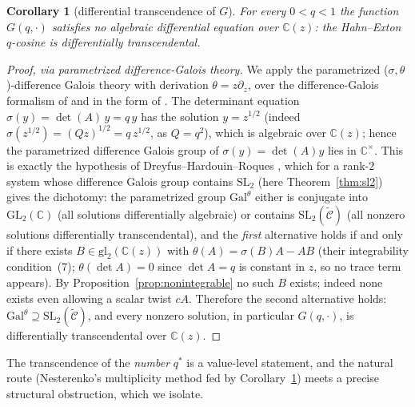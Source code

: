 \documentclass[11pt]{article}
\theoremstyle{plain}
\newtheorem{corollary}[theorem]{Corollary}
\theoremstyle{definition}
\theoremstyle{remark}
\newcommand{\C}{\mathbb{C}}
\begin{document}
\begin{corollary}[differential transcendence of $G$]
\label{cor:hypertranscendence}
For every $0<q<1$ the function $G(q,\cdot)$ satisfies no algebraic differential equation over
$\C(z)$: the Hahn--Exton $q$-cosine is differentially transcendental.
\end{corollary}

\begin{proof}[Proof, via parametrized difference-Galois theory]
We apply the parametrized ($\sigma,\theta$)-difference Galois theory with derivation
$\theta=z\partial_z$, over the difference-Galois formalism of \cite{PutSinger1997} and in the
form of \cite{DHR2018,ADR2021}. The determinant equation $\sigma(y)=\det(A)\,y=q\,y$ has the solution
$y=z^{1/2}$ (indeed $\sigma(z^{1/2})=(Qz)^{1/2}=q\,z^{1/2}$, as $Q=q^2$), which is algebraic over $\C(z)$; hence the parametrized difference Galois group of $\sigma(y)=\det(A)y$
lies in $\C^\times$. This is exactly the hypothesis of Dreyfus--Hardouin--Roques
\cite[Prop.~2.9]{DHR2018}, which for a rank-$2$ system whose difference Galois group contains
$\mathrm{SL}_2$ (here Theorem~\ref{thm:sl2}) gives the dichotomy: the parametrized group
$\mathrm{Gal}^\theta$ either is conjugate into $\mathrm{GL}_2(\C)$ (all solutions differentially
algebraic) or contains $\mathrm{SL}_2(\widetilde{\mathcal C})$ (all nonzero solutions
differentially transcendental), and the \emph{first} alternative holds if and only if there exists
$B\in\mathrm{gl}_2(\C(z))$ with $\theta(A)=\sigma(B)A-AB$ (their integrability condition~(7);
$\theta(\det A)=0$ since $\det A=q$ is constant in $z$, so no trace term appears). By
Proposition~\ref{prop:nonintegrable} no such $B$ exists; indeed none exists even allowing a
scalar twist $cA$. Therefore the second alternative holds:
$\mathrm{Gal}^\theta\supseteq\mathrm{SL}_2(\widetilde{\mathcal C})$, and every nonzero solution,
in particular $G(q,\cdot)$, is differentially transcendental over $\C(z)$.
\end{proof}

The transcendence of the \emph{number} $q^\ast$ is a value-level statement, and the natural route (Nesterenko's multiplicity method fed by Corollary~\ref{cor:hypertranscendence}) meets a precise
structural obstruction, which we isolate.
\end{document}
